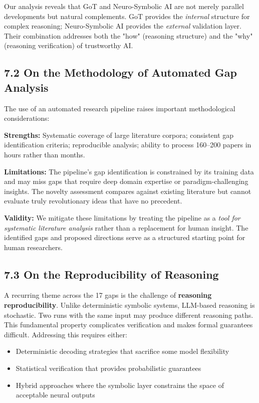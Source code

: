 \documentclass[11pt,a4paper]{article}
\begin{document}
Our analysis reveals that GoT and Neuro-Symbolic AI are not merely parallel developments but natural complements. GoT provides the \textit{internal} structure for complex reasoning; Neuro-Symbolic AI provides the \textit{external} validation layer. Their combination addresses both the "how" (reasoning structure) and the "why" (reasoning verification) of trustworthy AI.

\subsection{7.2 On the Methodology of Automated Gap Analysis}

The use of an automated research pipeline raises important methodological considerations:

\textbf{Strengths:} Systematic coverage of large literature corpora; consistent gap identification criteria; reproducible analysis; ability to process 160–200 papers in hours rather than months.

\textbf{Limitations:} The pipeline's gap identification is constrained by its training data and may miss gaps that require deep domain expertise or paradigm-challenging insights. The novelty assessment compares against existing literature but cannot evaluate truly revolutionary ideas that have no precedent.

\textbf{Validity:} We mitigate these limitations by treating the pipeline as a \textit{tool for systematic literature analysis} rather than a replacement for human insight. The identified gaps and proposed directions serve as a structured starting point for human researchers.

\subsection{7.3 On the Reproducibility of Reasoning}

A recurring theme across the 17 gaps is the challenge of \textbf{reasoning reproducibility}. Unlike deterministic symbolic systems, LLM-based reasoning is stochastic. Two runs with the same input may produce different reasoning paths. This fundamental property complicates verification and makes formal guarantees difficult. Addressing this requires either:
\begin{itemize}
  \item Deterministic decoding strategies that sacrifice some model flexibility
  \item Statistical verification that provides probabilistic guarantees
  \item Hybrid approaches where the symbolic layer constrains the space of acceptable neural outputs
\end{itemize}
\end{document}
